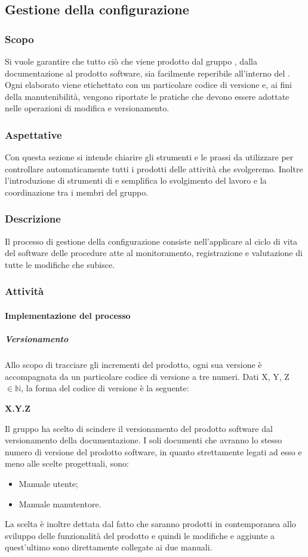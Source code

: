 \subsection{Gestione della configurazione}

\subsubsection{Scopo}
Si vuole garantire che tutto ciò che viene prodotto dal gruppo \Gruppo{}, dalla documentazione al prodotto software, sia facilmente reperibile all’interno del .
Ogni elaborato viene etichettato con un particolare codice di versione e, ai fini della manutenibilità, vengono riportate le pratiche che devono essere adottate nelle operazioni di modifica e versionamento.

\subsubsection{Aspettative}
Con questa sezione si intende chiarire gli strumenti e le prassi da utilizzare per controllare automaticamente tutti i prodotti delle attività che svolgeremo.
Inoltre l'introduzione di strumenti di  e  semplifica lo svolgimento del lavoro e la coordinazione tra i membri del gruppo.

\subsubsection{Descrizione}
Il processo di gestione della configurazione consiste nell'applicare al ciclo di vita del software delle procedure atte al monitoramento, registrazione e valutazione di tutte 
le modifiche che subisce.

\subsubsection{Attività}
\paragraph{Implementazione del processo}
\subparagraph*{Versionamento}
Allo scopo di tracciare gli incrementi del prodotto, ogni sua versione è accompagnata da un particolare codice di versione a tre numeri. Dati X, Y, Z $\in \mathbb{N}$, la forma del codice di versione è la seguente:
\begin{center}
	\textbf{X.Y.Z}
\end{center}
Il gruppo ha scelto di scindere il versionamento del prodotto software dal versionamento della documentazione.
I soli documenti che avranno lo stesso numero di versione del prodotto software, in quanto strettamente legati ad esso e meno alle scelte progettuali, sono:
\begin{itemize}
	\item Manuale utente;
	\item Manuale manutentore.
\end{itemize}
La scelta è inoltre dettata dal fatto che saranno prodotti in contemporanea allo sviluppo delle funzionalità del prodotto e quindi le modifiche e aggiunte a quest'ultimo sono direttamente collegate ai due manuali.\\

